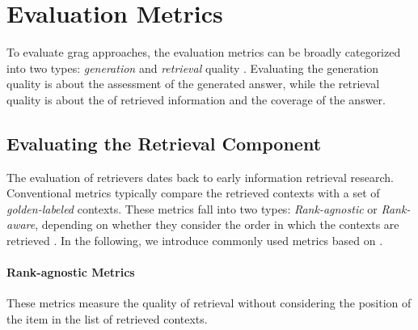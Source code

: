 




\section{Evaluation Metrics}
\label{sec:fundamentals_evaluation_rag}

To evaluate \gls{grag} approaches, the evaluation metrics can be broadly categorized into two types: \emph{generation} and \emph{retrieval} quality \cite{peng_graph_2024,yu_evaluation_2024}. Evaluating the generation quality is about the assessment of the generated answer, while the retrieval quality is about the of retrieved information and the coverage of the answer.


\subsection{Evaluating the Retrieval Component}

The evaluation of retrievers dates back to early information retrieval research. Conventional metrics typically compare the retrieved contexts with a set of \emph{golden-labeled} contexts. These metrics fall into two types: \emph{Rank-agnostic} or \emph{Rank-aware}, depending on whether they consider the order in which the contexts are retrieved \cite{yu_evaluation_2024,alinejad_evaluating_2024}. In the following, we introduce commonly used metrics based on  \textcite{yu_evaluation_2024, ibrahim_survey_2024,hu_unveiling_2024}.

\paragraph{Rank-agnostic Metrics} These metrics measure the quality of retrieval without considering the position of the item in the list of retrieved contexts. 


